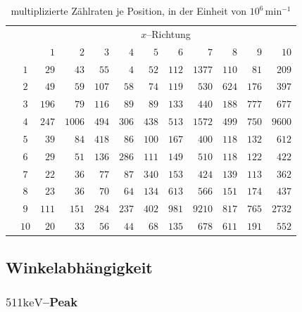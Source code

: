 \documentclass[12pt,a4paper]{scrartcl}
\numberwithin{equation}{section} %
\newcommand{\pu}[1]{\ensuremath{\mathrm{#1}}}
\begin{document}
\begin{table}
	\vspace{24pt}
	\begin{tabular}{cc|rrrrrrrrrr}
		 && \multicolumn{10}{c}{$x$--Richtung} \\
		 && $1$ & $2$ & $3$ & $4$ & $5$ & $6$ & $7$ & $8$ & $9$ & $10$ \\
		 \hline
		\multirow{10}{*}{\rotatebox{90}{$y$--Richtung}} &$1$  & $29$ & $43$ & $55$ & $4$ & $52$ & $112$ & $1377$ & $110$ & $81$ & $209$ \\
		&$2$  & $49$ & $59$ & $107$ & $58$ & $74$ & $119$ & $530$ & $624$ & $176$ & $397$ \\
		&$3$  & $196$ & $79$ & $116$ & $89$ & $89$ & $133$ & $440$ & $188$ & $777$ & $677$ \\
		&$4$  & $247$ & $1006$ & $494$ & $306$ & $438$ & $513$ & $1572$ & $499$ & $750$ & $9600$ \\
		&$5$  & $39$ & $84$ & $418$ & $86$ & $100$ & $167$ & $400$ & $118$ & $132$ & $612$ \\
		&$6$  & $29$ & $51$ & $136$ & $286$ & $111$ & $149$ & $510$ & $118$ & $122$ & $422$ \\
		&$7$  & $22$ & $36$ & $77$ & $87$ & $340$ & $153$ & $424$ & $139$ & $113$ & $362$ \\
		&$8$  & $23$ & $36$ & $70$ & $64$ & $134$ & $613$ & $566$ & $151$ & $174$ & $437$ \\
		&$9$  & $111$ & $151$ & $284$ & $237$ & $402$ & $981$ & $9210$ & $817$ & $765$ & $2732$ \\
		&$10$  & $20$ & $33$ & $56$ & $44$ & $68$ & $135$ & $678$ & $611$ & $191$ & $552$ \\
	\end{tabular}
	\caption{multiplizierte Zählraten je Position, in der Einheit von $10^6\, \mathrm{min^{-1}}$}
	\label{tab:PET Matrix}
\end{table}

\clearpage
\hypertarget{winkelabhuxe4ngigkeit}{%
\subsection{Winkelabhängigkeit}\label{winkelabhuxe4ngigkeit}}

\hypertarget{pu511kevpeak}{%
	\subsubsection{\texorpdfstring{$\pu{511keV}$--Peak}{\textbackslash pu\{511keV\}--Peak}}\label{pu511kevpeak}}
\end{document}
